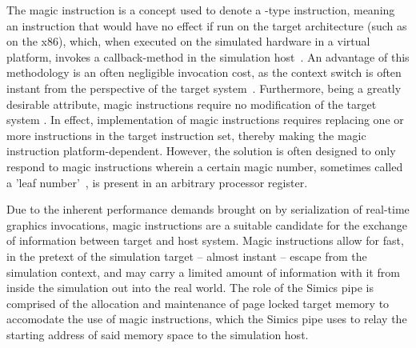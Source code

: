 The magic instruction is a concept used to denote a -type instruction, meaning an instruction that would have no effect if run on the target architecture (such as  on the x86), which, when executed on the simulated hardware in a virtual platform, invokes a callback-method in the simulation host~.
An advantage of this methodology is an often negligible invocation cost, as the context switch is often instant from the perspective of the target system~.
Furthermore, being a greatly desirable attribute, magic instructions require no modification of the target system .
In effect, implementation of magic instructions requires replacing one or more instructions in the target instruction set, thereby making the magic instruction platform-dependent.
However, the solution is often designed to only respond to magic instructions wherein a certain magic number, sometimes called a 'leaf number'~, is present in an arbitrary processor register.

Due to the inherent performance demands brought on by serialization of real-time graphics invocations, magic instructions are a suitable candidate for the exchange of information between target and host system.
Magic instructions allow for fast, in the pretext of the simulation target -- almost instant -- escape from the simulation context, and may carry a limited amount of information with it from inside the simulation out into the real world.
The role of the Simics pipe is comprised of the allocation and maintenance of page locked target memory to accomodate the use of magic instructions, which the Simics pipe uses to relay the starting address of said memory space to the simulation host.

